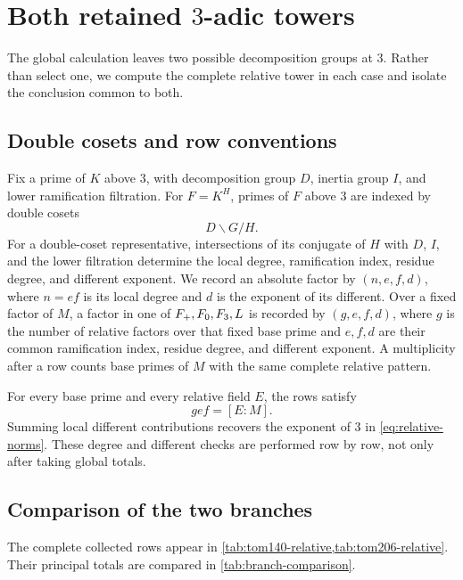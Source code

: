 \section{Both retained \texorpdfstring{$3$}{3}-adic towers}
\label{sec:local}

The global calculation leaves two possible decomposition groups at $3$.
Rather than select one, we compute the complete relative tower in each case
and isolate the conclusion common to both.

\subsection{Double cosets and row conventions}

Fix a prime of $K$ above $3$, with decomposition group $D$, inertia group
$I$, and lower ramification filtration.  For $F=K^H$, primes of $F$ above
$3$ are indexed by double cosets
\begin{equation}
 D\backslash G/H.
 \label{eq:double-cosets}
\end{equation}
For a double-coset representative, intersections of its conjugate of $H$ with $D$, $I$, and
the lower filtration determine the local degree, ramification index, residue
degree, and different exponent.  We record an absolute factor by
$(n,e,f,d)$, where $n=ef$ is its local degree and $d$ is the exponent of its
different.  Over a fixed factor of $M$, a factor in one of
$F_{+},F_{0},F_{3},L$ is recorded by $(g,e,f,d)$, where $g$ is the
number of relative factors over that fixed base prime and $e,f,d$ are their
common ramification index, residue degree, and different exponent.  A
multiplicity after a row counts base primes of $M$ with the same complete
relative pattern.

For every base prime and every relative field $E$, the rows satisfy
\begin{equation}
 g e f=[E:M].
 \label{eq:local-degree-check}
\end{equation}
Summing local different contributions recovers the exponent of $3$ in
\eqref{eq:relative-norms}.  These degree and different checks are performed
row by row, not only after taking global totals.

\subsection{Comparison of the two branches}

The complete collected rows appear in \cref{tab:tom140-relative,tab:tom206-relative}.
Their principal totals are compared in \cref{tab:branch-comparison}.


